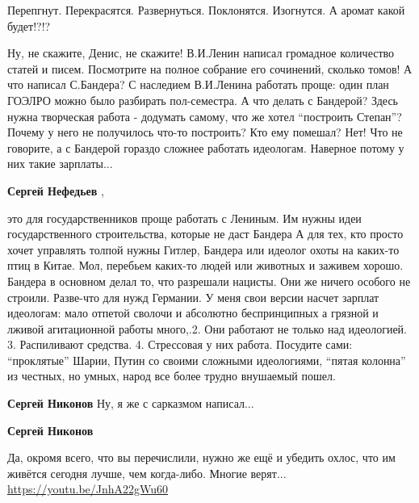  
 
 
 
 
\zzSecCmt

\begin{itemize} %
Перепгнут. Перекрасятся.
Развернуться. Поклонятся.
Изогнутся. А аромат какой будет!?!?


Ну, не скажите, Денис, не скажите! В.И.Ленин написал громадное количество
статей и писем. Посмотрите на полное собрание его сочинений, сколько томов! А
что написал С.Бандера? С наследием В.И.Ленина работать проще: один план ГОЭЛРО
можно было разбирать пол-семестра. А что делать с Бандерой? Здесь нужна
творческая работа - додумать самому, что же хотел \enquote{построить Степан}? Почему у
него не получилось что-то построить? Кто ему помешал? Нет! Что не говорите, а с
Бандерой гораздо сложнее работать идеологам. Наверное потому у них такие
зарплаты...

\begin{itemize} %
\textbf{Сергей Нефедьев} , 

это для государственников проще работать с Лениным. Им нужны идеи
государственного строительства, которые не даст Бандера А для тех, кто просто
хочет управлять толпой нужны Гитлер, Бандера или идеолог охоты на каких-то птиц
в Китае. Мол, перебьем каких-то людей или животных и заживем хорошо. Бандера в
основном делал то, что разрешали нацисты. Они же ничего особого не строили.
Разве-что для нужд Германии. У меня свои версии насчет зарплат идеологам: мало
отпетой сволочи и абсолютно беспринципных а грязной и лживой агитационной
работы много,.2. Они работают не только над идеологией. 3. Распиливают
средства. 4. Стрессовая у них работа. Посудите сами: \enquote{проклятые} Шарии, Путин
со своими сложными идеологиями, \enquote{пятая колонна} из честных, но умных, народ все
более трудно внушаемый пошел.


\textbf{Сергей Никонов} Ну, я же с сарказмом написал...

\textbf{Сергей Никонов} 

Да, окромя всего, что вы перечислили, нужно же ещё и убедить охлос, что им
живётся сегодня лучше, чем когда-либо. Многие верят...
\url{https://youtu.be/JnhA22gWu60}


\end{itemize}
\end{itemize}
